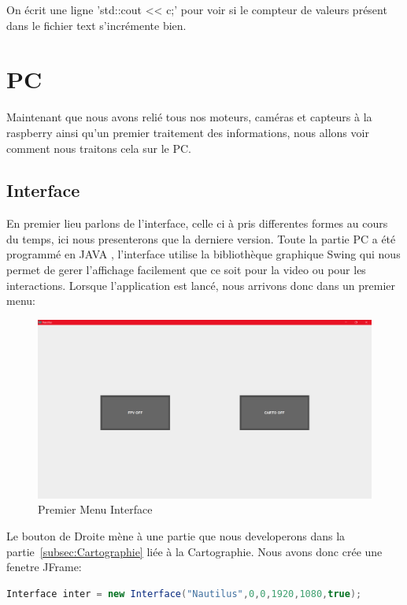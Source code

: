 \documentclass[a4paper,11pt]{report}
\begin{document}
		\newline 
		On écrit une ligne 'std::cout << c;' pour voir si le compteur de valeurs présent dans le fichier text s'incrémente bien.  
		\newpage
	\section{PC}
		Maintenant que nous avons relié tous nos moteurs, caméras et capteurs à la raspberry ainsi qu'un premier traitement des informations, nous allons voir comment nous traitons cela sur le PC.
		
		\subsection{Interface}
			En premier lieu parlons de l'interface, celle ci à pris differentes formes au cours du temps, ici nous presenterons que la derniere version. Toute la partie PC a été programmé en JAVA \cite{ref4}, l'interface utilise la bibliothèque graphique Swing qui nous permet de gerer l'affichage facilement que ce soit pour la video ou pour les interactions.
			Lorsque l'application est lancé, nous arrivons donc dans un premier menu:
			\begin{figure}[!h]
					\begin{center}
						\includegraphics[scale=0.35]{Photos/Interface1.png}
						\caption{Premier Menu Interface}
					\end{center}
				\end{figure}
				\newline Le bouton de Droite mène à une partie que nous developerons dans la partie~\ref{subsec:Cartographie} liée à la Cartographie.
				\newline \newline Nous avons donc crée une fenetre JFrame:
				\begin{lstlisting}[language=java]
Interface inter = new Interface("Nautilus",0,0,1920,1080,true);
				\end{lstlisting}
\end{document}
